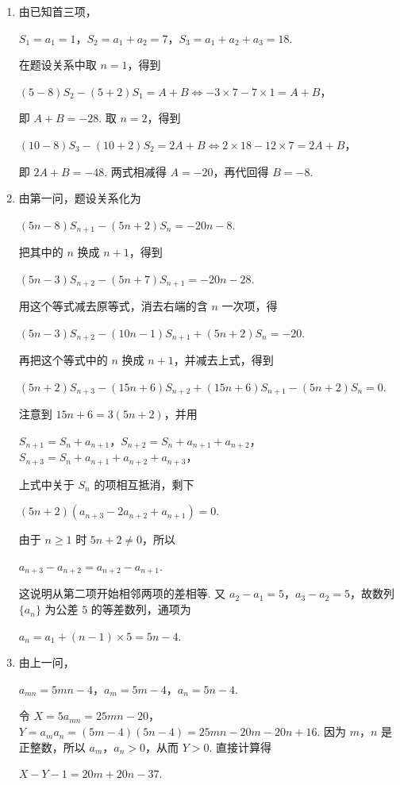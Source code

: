 \begin{solution}
\begin{enumerate}
\item 由已知首三项，

\(S_1=a_1=1\)，\(S_2=a_1+a_2=7\)，\(S_3=a_1+a_2+a_3=18\).

在题设关系中取 \(n=1\)，得到

\((5-8)S_2-(5+2)S_1=A+B\iff-3\times7-7\times1=A+B\)，

即 \(A+B=-28\). 取 \(n=2\)，得到

\((10-8)S_3-(10+2)S_2=2A+B\iff2\times18-12\times7=2A+B\)，

即 \(2A+B=-48\). 两式相减得 \(A=-20\)，再代回得 \(B=-8\).
\item 由第一问，题设关系化为

\((5n-8)S_{n+1}-(5n+2)S_n=-20n-8\).

把其中的 \(n\) 换成 \(n+1\)，得到

\((5n-3)S_{n+2}-(5n+7)S_{n+1}=-20n-28\).

用这个等式减去原等式，消去右端的含 \(n\) 一次项，得

\((5n-3)S_{n+2}-(10n-1)S_{n+1}+(5n+2)S_n=-20\).

再把这个等式中的 \(n\) 换成 \(n+1\)，并减去上式，得到

\((5n+2)S_{n+3}-(15n+6)S_{n+2}+(15n+6)S_{n+1}-(5n+2)S_n=0\).

注意到 \(15n+6=3(5n+2)\)，并用

\(S_{n+1}=S_n+a_{n+1}\)，\(S_{n+2}=S_n+a_{n+1}+a_{n+2}\)，\(S_{n+3}=S_n+a_{n+1}+a_{n+2}+a_{n+3}\)，

上式中关于 \(S_n\) 的项相互抵消，剩下

\((5n+2)(a_{n+3}-2a_{n+2}+a_{n+1})=0\).

由于 \(n\geqslant1\) 时 \(5n+2\neq0\)，所以

\(a_{n+3}-a_{n+2}=a_{n+2}-a_{n+1}\).

这说明从第二项开始相邻两项的差相等. 又 \(a_2-a_1=5\)，\(a_3-a_2=5\)，故数列 \(\{a_n\}\) 为公差 \(5\) 的等差数列，通项为

\(a_n=a_1+(n-1)\times5=5n-4\).
\item 由上一问，

\(a_{mn}=5mn-4\)，\(a_m=5m-4\)，\(a_n=5n-4\).

令 \(X=5a_{mn}=25mn-20\)，\(Y=a_ma_n=(5m-4)(5n-4)=25mn-20m-20n+16\). 因为 \(m\)，\(n\) 是正整数，所以 \(a_m\)，\(a_n>0\)，从而 \(Y>0\). 直接计算得

\(X-Y-1=20m+20n-37\).


\end{enumerate}
\end{solution}
